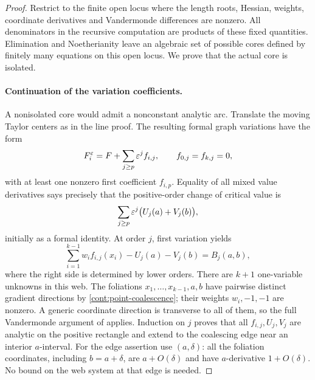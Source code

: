 \begin{proof}
Restrict to the finite open locus where the length roots,
Hessian, weights, coordinate derivatives and Vandermonde
differences are nonzero.  All denominators in the recursive
computation are products of these fixed quantities.
Elimination and Noetherianity leave an algebraic set of
possible cores defined by finitely many equations on this
open locus.  We prove that the
actual core is isolated.

\paragraph{Continuation of the variation coefficients.}
A nonisolated core would admit a nonconstant analytic arc.
Translate the moving Taylor centers as in the line proof.
The resulting formal graph variations have the form
\begin{equation}
 F_i^\varepsilon=F+\sum_{j\ge p}\varepsilon^j f_{i,j},
 \qquad f_{0,j}=f_{k,j}=0,
 \label{cont:point-formal-deformation}
\end{equation}
with at least one nonzero first coefficient \(f_{i,p}\).
Equality of all mixed value derivatives says precisely that
the positive-order change of critical value is
\[
 \sum_{j\ge p}\varepsilon^j\bigl(U_j(a)+V_j(b)\bigr),
\]
initially as a formal identity.  At order \(j\), first
variation yields
\begin{equation}
 \sum_{i=1}^{k-1}w_i f_{i,j}(x_i)-U_j(a)-V_j(b)
                  =B_j(a,b),
 \label{cont:point-variation-web}
\end{equation}
where the right side is determined by lower orders.
There are \(k+1\) one-variable unknowns in this web.  The
foliations \(x_1,\ldots,x_{k-1},a,b\) have pairwise distinct
gradient directions by \eqref{cont:point-coalescence};
their weights \(w_i,-1,-1\) are nonzero.  A generic coordinate
direction is transverse to all of them, so the full
Vandermonde argument of  applies.
Induction on \(j\) proves that all \(f_{i,j},U_j,V_j\) are
analytic on the positive rectangle and extend to the
coalescing edge near an interior \(a\)-interval.  For the
edge assertion use \((a,\delta)\): all the foliation
coordinates, including \(b=a+\delta\), are \(a+O(\delta)\)
and have \(a\)-derivative \(1+O(\delta)\).  No bound on the
web system at that edge is needed.


\end{proof}
